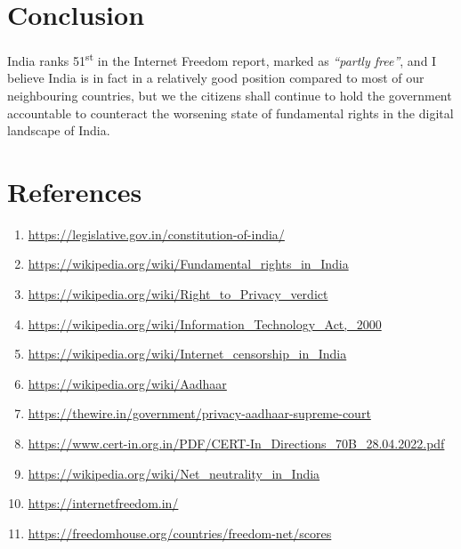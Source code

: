 \documentclass[11pt,a4paper,oneside]{scrarticle}
\newcommand{\link}[1]{\href{#1}{\url{#1}}}
\begin{document}


    \section*{Conclusion}\label{sec:conclusion}
    India ranks 51\textsuperscript{st} in the Internet Freedom report, marked as \textit{``partly free''}, and I believe
    India is in fact in a relatively good position compared to most of our neighbouring countries, but we the citizens
    shall continue to hold the government accountable to counteract the worsening state of fundamental rights in the
    digital landscape of India.




    \newpage
    \section*{References}\label{sec:references}

    \begin{enumerate}
        \singlespacing
        \item \link{https://legislative.gov.in/constitution-of-india/}
        \item \link{https://wikipedia.org/wiki/Fundamental_rights_in_India}
        \item \link{https://wikipedia.org/wiki/Right_to_Privacy_verdict}
        \item \link{https://wikipedia.org/wiki/Information_Technology_Act,_2000}
        \item \link{https://wikipedia.org/wiki/Internet_censorship_in_India}
        \item \link{https://wikipedia.org/wiki/Aadhaar}
        \item \link{https://thewire.in/government/privacy-aadhaar-supreme-court}
        \item \link{https://www.cert-in.org.in/PDF/CERT-In_Directions_70B_28.04.2022.pdf}
        \item \link{https://wikipedia.org/wiki/Net_neutrality_in_India}
        \item \link{https://internetfreedom.in/}
        \item \link{https://freedomhouse.org/countries/freedom-net/scores}
    \end{enumerate}
\end{document}
